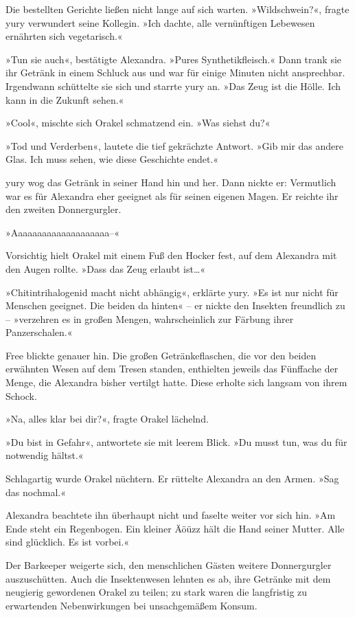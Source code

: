 Die bestellten Gerichte ließen nicht lange auf sich warten. »Wildschwein?«, fragte yury verwundert seine Kollegin. »Ich dachte, alle vernünftigen Lebewesen ernährten sich vegetarisch.«

»Tun sie auch«, bestätigte Alexandra. »Pures Synthetikfleisch.« Dann trank sie ihr Getränk in einem Schluck aus und war für einige Minuten nicht ansprechbar. Irgendwann schüttelte sie sich und starrte yury an. »Das Zeug ist die Hölle. Ich kann in die Zukunft sehen.«

»Cool«, mischte sich Orakel schmatzend ein. »Was siehst du?«

»Tod und Verderben«, lautete die tief gekrächzte Antwort. »Gib mir das andere Glas. Ich muss sehen, wie diese Geschichte endet.«

yury wog das Getränk in seiner Hand hin und her. Dann nickte er: Vermutlich war es für Alexandra eher geeignet als für seinen eigenen Magen. Er reichte ihr den zweiten Donnergurgler.

»Aaaaaaaaaaaaaaaaaaaa–«

Vorsichtig hielt Orakel mit einem Fuß den Hocker fest, auf dem Alexandra mit den Augen rollte. »Dass das Zeug erlaubt ist…«

»Chitintrihalogenid macht nicht abhängig«, erklärte yury. »Es ist nur nicht für Menschen geeignet. Die beiden da hinten« – er nickte den Insekten freundlich zu – »verzehren es in großen Mengen, wahrscheinlich zur Färbung ihrer Panzerschalen.«

Free blickte genauer hin. Die großen Getränkeflaschen, die vor den beiden erwähnten Wesen auf dem Tresen standen, enthielten jeweils das Fünffache der Menge, die Alexandra bisher vertilgt hatte. Diese erholte sich langsam von ihrem Schock.

»Na, alles klar bei dir?«, fragte Orakel lächelnd.

»Du bist in Gefahr«, antwortete sie mit leerem Blick. »Du musst tun, was du für notwendig hältst.«

Schlagartig wurde Orakel nüchtern. Er rüttelte Alexandra an den Armen. »Sag das nochmal.«

Alexandra beachtete ihn überhaupt nicht und faselte weiter vor sich hin. »Am Ende steht ein Regenbogen. Ein kleiner Äöüzz hält die Hand seiner Mutter. Alle sind glücklich.  Es ist vorbei.«

Der Barkeeper weigerte sich, den menschlichen Gästen weitere Donnergurgler auszuschütten. Auch die Insektenwesen lehnten es ab, ihre Getränke mit dem neugierig gewordenen Orakel zu teilen; zu stark waren die langfristig zu erwartenden Nebenwirkungen bei unsachgemäßem Konsum.

